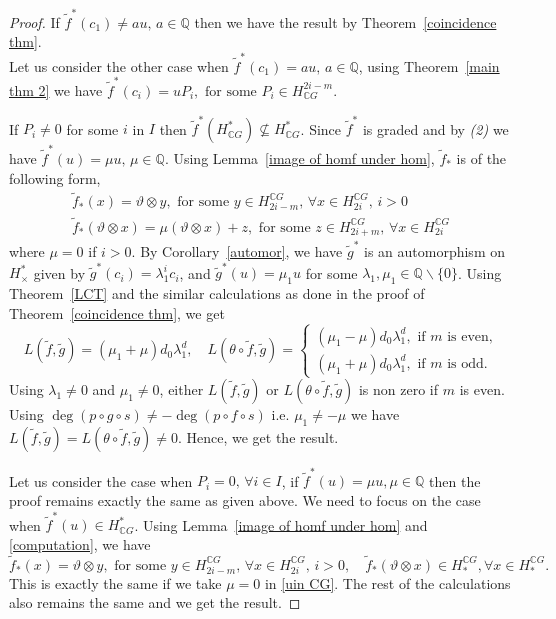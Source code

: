 \documentclass{amsart}
\newcommand{\thmref}[1]{Theorem~\ref{#1}}
\newcommand{\lemref}[1]{Lemma~\ref{#1}}
\newcommand{\corref}[1]{Corollary~\ref{#1}}
\begin{document}
\begin{proof}
	If $\tilde{f}^*(c_1) \neq au, \, a\in \mathbb{Q}$ then we have the result by \thmref{coincidence thm}.\\ Let us consider the other case when $\tilde{f}^*(c_1) = au, \, a\in \mathbb{Q}$, using \thmref{main thm 2} we have $\tilde{f}^*(c_i) = uP_i, \text{ for some } P_i\in H^{2i-m}_{\mathbb{C}G}.$ 
	
	If $P_i \neq 0$ for some $i$ in $I$ then $\tilde{f}^*(H^*_{\mathbb CG}) \nsubseteq H^*_{\mathbb CG}$. Since $\tilde{f}^*$ is graded and by \textit{(2)} we have $\tilde{f}^*(u) = \mu u,\, \mu \in \mathbb{Q}$. Using \lemref{image of homf under hom}, $\tilde{f}_*$ is of the following form, \begin{equation}\label{uin CG}
		\begin{split}
			\tilde f_*(x)= \vartheta\otimes y, \text{ for some }y\in H_{2i-m}^{\mathbb CG}, \, \forall x \in H_{2i}^{\mathbb{C}G}, \, i>0\\
			\tilde f_*(\vartheta\otimes x)=\mu(\vartheta\otimes x) +z, \text{ for some }z\in H_{2i+m}^{\mathbb CG},\, \forall x \in H_{2i}^{\mathbb{C}G}
		\end{split}
	\end{equation}
	where $\mu =0$ if $i>0$. By \corref{automor}, we have $\tilde g^*$ is an automorphism on $H^*_{\times}$ given by
	$\tilde g^*(c_i) = \lambda_1^i c_i$, and $\tilde g^*(u) = \mu_1 u$ for some $\lambda_1, \mu_1 \in \mathbb{Q}\backslash \{0\}$. Using \thmref{LCT} and the similar calculations as done in the proof of \thmref{coincidence thm}, we get $$L(\tilde f,\tilde g) =(\mu_1 + \mu) d_0 \lambda_1^d, \quad L(\theta \circ\tilde f,\tilde g) =\begin{cases}
		(\mu_1 - \mu)d_{0} \lambda_1^{d},  \text{ if } m \text{ is even,}\\
		(\mu_1 +\mu)d_{0} \lambda_1^{d},  \text{ if } m \text{ is odd.}
	\end{cases}$$ Using $\lambda_1 \neq 0$ and $\mu_1 \neq 0$, either $L(\tilde f,\tilde g) $ or $ L(\theta \circ\tilde f,\tilde g)$ is non zero if $m$ is even. Using $\deg(p\circ g \circ s)\neq -\deg (p\circ f\circ s)$ i.e. $\mu_1 \neq -\mu$ we have $L(\tilde f, \tilde g) = L(\theta \circ \tilde f, \tilde g) \neq 0$.  Hence, we get the result.
	
	Let us consider the case when $P_i =0,\, \forall i \in I$, if $\tilde{f}^*(u) = \mu u, \mu \in \mathbb{Q}$ then the proof remains exactly the same as given above. We need to focus on the case when $\tilde{f}^*(u)\in H^*_{\mathbb{C}G}$. Using \lemref{image of homf under hom} and \eqref{computation}, we have $$\tilde{f}_*(x) = \vartheta \otimes y, \text{ for some }y\in H_{2i-m}^{\mathbb CG}, \, \forall x \in H_{2i}^{\mathbb{C}G}, \, i>0, \quad \tilde{f}_*(\vartheta \otimes x) \in H_*^{\mathbb{C}G}, \forall x\in  H_*^{\mathbb{C}G}.$$ This is exactly the same if we take $\mu =0$ in \eqref{uin CG}. The rest of the calculations also remains the same and we get the result.
\end{proof}
\end{document}
